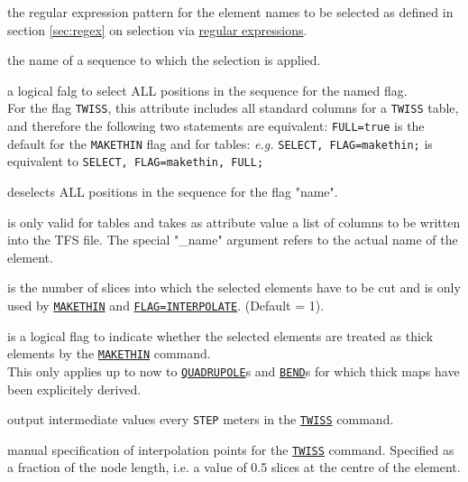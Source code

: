 \begin{madlist}
   the regular expression pattern for the element names
  to be selected as defined in section \ref{sec:regex} on selection via
  \hyperref[sec:regex]{regular expressions}. 

   the name of a sequence to which the selection is applied.

   a logical falg to select ALL positions in the sequence
  for the named flag. \\
  For the flag \texttt{TWISS}, this attribute includes all standard
  columns for a \texttt{TWISS} table, and therefore the following two
  statements are equivalent:
  \texttt{FULL=true} is the default for the \texttt{MAKETHIN} flag and
  for tables: \textsl{e.g.} \texttt{SELECT, FLAG=makethin;} is
  equivalent to \texttt{SELECT, FLAG=makethin, FULL;}   
  
   deselects ALL positions in the sequence for the flag
  "name".

   is only valid for tables and takes as attribute value
  a list of columns to be written into the TFS file. The special "\_name"
  argument refers to the actual name of the element. 

   is the number of slices into which the selected
  elements have to be cut and is only used by
  \hyperref[chap:makethin]{\texttt{MAKETHIN}} and
  \hyperref[chap:twiss]{\texttt{FLAG=INTERPOLATE}}. (Default = 1).

   is a logical flag to indicate  whether the selected
  elements are treated as thick elements by the
  \hyperref[chap:makethin]{\texttt{MAKETHIN}} command. \\  
  This only applies up to now to
  \hyperref[sec:quadrupole]{\texttt{QUADRUPOLE}}s and
  \hyperref[sec:bend]{\texttt{BEND}}s for which thick maps
  have been explicitely derived. 

   output intermediate values every \texttt{STEP} meters
  in the \hyperref[chap:twiss]{\texttt{TWISS}} command.

   manual specification of interpolation points for the
  \hyperref[chap:twiss]{\texttt{TWISS}} command. Specified as a
  fraction of the node length, i.e. a value of 0.5 slices at
  the centre of the element.
\end{madlist}

